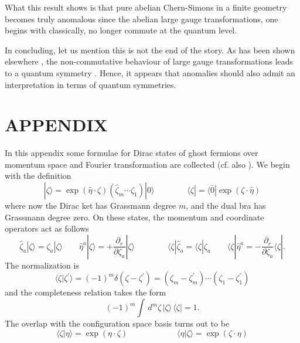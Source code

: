 \documentclass[a4paper,10pt]{article}
\begin{document}
What this result shows is that pure abelian Chern-Simons in a finite geometry becomes 
truly anomalous since the abelian large gauge transformations, one begins with 
classically, no longer commute at the quantum level.

In concluding, let us mention this is not the end of the story. As has been shown 
elsewhere \cite{Gren 98,Gren 00}, the non-commutative behaviour of large gauge 
transformations leads to a quantum symmetry \cite{Char 94}. Hence, it appears that 
anomalies should also admit an interpretation in terms of quantum symmetries.

\section{APPENDIX}

In this appendix some formulae for Dirac states of ghost fermions over momentum space and 
Fourier transformation are collected (cf. also \cite{Salo 82}). We begin with the definition
\begin{equation}
|\zeta\rangle=\exp(\hat{\eta}\cdot\zeta)(\hat{\zeta}_m\cdots\hat{\zeta}_1)
|0\rangle\qquad\quad\quad
\langle\zeta|=\langle\bar{0}|\exp(\zeta
\cdot\hat{\eta})
\end{equation}
where now the Dirac ket has Grassmann degree $m$, and the dual bra has Grassmann degree 
zero. On these states, the momentum and coordinate operators act as follows
\begin{equation}
\hat{\zeta}_a|\zeta\rangle=\zeta_a|\zeta\rangle\quad\quad\hat{\eta}^a|\zeta\rangle=+\frac
{\partial_r}{\partial\zeta_a}|\zeta\rangle\qquad\qquad\langle\zeta|\hat{\zeta}_a=\langle
\zeta|\zeta_a\quad\quad\langle\zeta|\hat{\eta}^a=-
\frac{\partial_r}{\partial\zeta_a}\langle\zeta|.
\end{equation}
The normalization is
\begin{equation}
\langle\zeta|\zeta^{\prime}\rangle=(-1)^m\delta(\zeta-\zeta^{\prime})=(\zeta_m-
\zeta^{\prime}_m)\cdots(\zeta_1-\zeta^{\prime}_1)
\end{equation}
and the completeness relation takes the form
\begin{equation}
(-1)^m\int\,d^{m}\zeta\,|\zeta\rangle\,\langle\zeta|=1.
\end{equation}
The overlap with the configuration space basis turns out to be
\begin{equation}
\langle\zeta|\eta\rangle=\exp(\eta\cdot\zeta)\qquad\qquad\qquad\langle\eta|\zeta\rangle=
\exp(
\zeta\cdot\eta)
\end{equation}
\end{document}
